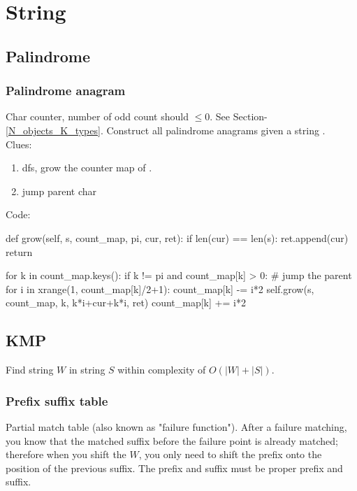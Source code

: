 \chapter{String}

\section{Palindrome}
\subsection{Palindrome anagram}
 Char counter, number of odd count should $\leq 0$.
 See Section-\ref{N_objects_K_types}.
 Construct all palindrome anagrams given a string .
\\
Clues:
\begin{enumerate}
\item dfs, grow the counter map of . 
\item jump parent char
\end{enumerate}
Code:
\begin{python}
def grow(self, s, count_map, pi, cur, ret):
  if len(cur) == len(s):
    ret.append(cur)
    return

  for k in count_map.keys():
    if k != pi and count_map[k] > 0:
      # jump the parent
      for i in xrange(1, count_map[k]/2+1):
        count_map[k] -= i*2
        self.grow(s, count_map, k, k*i+cur+k*i, ret)
        count_map[k] += i*2
\end{python}


\section{KMP}
Find string $W$ in string $S$ within complexity of $O(|W|+|S|)$.
\subsection{Prefix suffix table}
Partial match table (also known as "failure function"). After a failure matching, you know that the matched suffix before the failure point is already matched; therefore when you shift the $W$, you only need to shift the prefix onto the position of the previous suffix. The prefix and suffix must be proper prefix and suffix.

